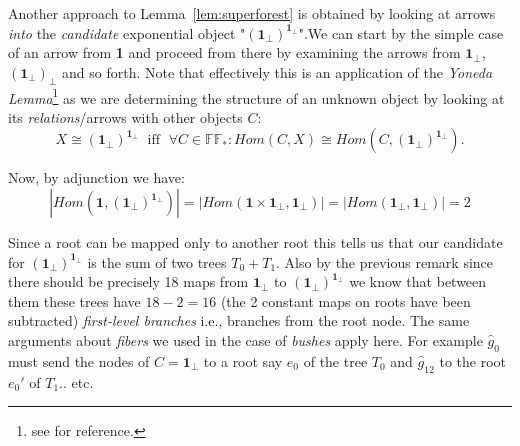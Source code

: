 \begin{remark}
	Another approach to Lemma~\ref{lem:superforest} is obtained by looking at arrows \emph{into} the  \emph{candidate} exponential object "$(\textbf{1}_\bot)^{\textbf{1}_\bot}$".\newline We can start by the simple case of an arrow from \textbf{1} and proceed from there by examining the arrows from $\textbf{1}_\bot$, $(\textbf{1}_\bot)_\bot$ and so forth.
	\newline
	Note that effectively this is an application of the \emph{Yoneda Lemma}\footnote{see \cite{awodey} for reference.} as we are determining the structure of an unknown object by looking at its \emph{relations}/arrows with other objects $C$:
	\begin{equation*}
	X \cong (\textbf{1}_\bot)^{\textbf{1}_\bot} \; \text{ iff } \;\forall C \in \mathbb{FF}_* : Hom(C,X) \cong Hom (C,(\textbf{1}_\bot)^{\textbf{1}_\bot}). 
	\end{equation*}
\end{remark}
Now,\newline
by adjunction we have: 
\[ |Hom(\textbf{1}, (\textbf{1}_\bot)^{\textbf{1}_\bot})|=|Hom(\textbf{1} \times \textbf{1}_\bot, \textbf{1}_\bot)| = |Hom(\textbf{1}_\bot, \textbf{1}_\bot)| =2\]

Since a root can be mapped only to another root this tells us that our candidate for $(\textbf{1}_\bot)^{\textbf{1}_\bot}$ is the sum of two trees $T_0 + T_1$.
\newline
 Also by the previous remark since there should be precisely 18 maps from $\textbf{1}_\bot$ to $(\textbf{1}_\bot)^{\textbf{1}_\bot}$ we know that between them these trees have $18 - 2 = 16$ (the 2 constant maps on roots have been subtracted) \emph{first-level branches} i.e., branches from the root node. \newline
The same arguments about \emph{fibers} we used in the case of \emph{bushes} apply here. 
For example $\hat{g}_0$ must send the nodes of $C=\textbf{1}_\bot$ to a root say $e_0$ of the tree $T_0$ and $\hat{g}_{12}$ to the root $e_0'$ of $T_1$.. etc.
 \newpage


